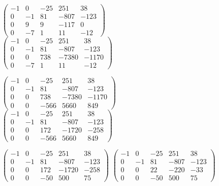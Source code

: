 \documentclass[10pt]{article}
\begin{document}
\begin{figure}[H]
	\text{ = }
	$\begin{pmatrix}
		-1 & 0 & -25 & 251 & 38 \\
		0 & -1 & 81 & -807 & -123 \\
		0 & 9 & 9 & -117 & 0 \\
		0 & -7 & 1 & 11 & -12
	\end{pmatrix}$
	\text{ = }
	$\begin{pmatrix}
		-1 & 0 & -25 & 251 & 38 \\
		0 & -1 & 81 & -807 & -123 \\
		0 & 0 & 738 & -7380 & -1170 \\
		0 & -7 & 1 & 11 & -12
	\end{pmatrix}$
	\text{ = }	

	\text{ = }
	$\begin{pmatrix}
		-1 & 0 & -25 & 251 & 38 \\
		0 & -1 & 81 & -807 & -123 \\
		0 & 0 & 738 & -7380 & -1170 \\
		0 & 0 & -566 & 5660 & 849
	\end{pmatrix}$
	\text{ = }
	$\begin{pmatrix}
		-1 & 0 & -25 & 251 & 38 \\
		0 & -1 & 81 & -807 & -123 \\
		0 & 0 & 172 & -1720 & -258 \\
		0 & 0 & -566 & 5660 & 849
	\end{pmatrix}$
	\text{ = }
	
	\text{ = }
	$\begin{pmatrix}
		-1 & 0 & -25 & 251 & 38 \\
		0 & -1 & 81 & -807 & -123 \\
		0 & 0 & 172 & -1720 & -258 \\
		0 & 0 & -50 & 500 & 75
	\end{pmatrix}$
	\text{ = }
	$\begin{pmatrix}
		-1 & 0 & -25 & 251 & 38 \\
		0 & -1 & 81 & -807 & -123 \\
		0 & 0 & 22 & -220 & -33 \\
		0 & 0 & -50 & 500 & 75
	\end{pmatrix}$
	\text{ = }
\end{figure}
\end{document}

